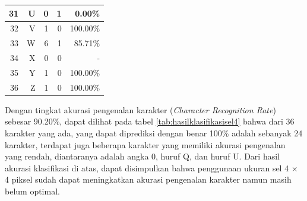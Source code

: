 \begin{longtable}[c]{|r|r|r|r|r|}
	31           & U                 & 0                       & 1                       &0.00\%            \\ \hline
	32           & V                 & 1                       & 0                       &100.00\%            \\ \hline
	33           & W                 & 6                       & 1                       &85.71\%            \\ \hline
	34           & X                 & 0                       & 0                       & -            \\ \hline
	35           & Y                 & 1                       & 0                       &100.00\%            \\ \hline
	36           & Z                 & 1                       & 0                       &100.00\%            \\ \hline
\end{longtable}

\noindent Dengan tingkat akurasi pengenalan karakter (\textit{Character Recognition Rate}) sebesar 90.20\%, dapat dilihat pada tabel \ref{tab:hasilklasifikasisel4} bahwa dari 36  karakter yang ada, yang dapat diprediksi dengan benar 100\% adalah sebanyak 24 karakter, terdapat juga beberapa karakter yang memiliki akurasi pengenalan yang rendah, diantaranya adalah angka 0, huruf Q, dan huruf U. Dari hasil akurasi klasifikasi di atas, dapat  disimpulkan bahwa penggunaan ukuran sel 4 $\times$ 4 piksel sudah dapat meningkatkan akurasi pengenalan karakter namun masih belum optimal.

